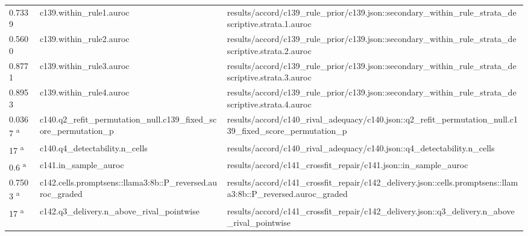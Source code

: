 \begin{longtable}{@{}p{0.7in}p{1.9in}p{2.6in}@{}}
0.7339 & c139.\allowbreak{}within\_rule1.\allowbreak{}auroc & results/\allowbreak{}accord/\allowbreak{}c139\_rule\_prior/\allowbreak{}c139.\allowbreak{}json::secondary\_within\_rule\_strata\_descriptive.\allowbreak{}strata.\allowbreak{}1.\allowbreak{}auroc\\
0.5600 & c139.\allowbreak{}within\_rule2.\allowbreak{}auroc & results/\allowbreak{}accord/\allowbreak{}c139\_rule\_prior/\allowbreak{}c139.\allowbreak{}json::secondary\_within\_rule\_strata\_descriptive.\allowbreak{}strata.\allowbreak{}2.\allowbreak{}auroc\\
0.8771 & c139.\allowbreak{}within\_rule3.\allowbreak{}auroc & results/\allowbreak{}accord/\allowbreak{}c139\_rule\_prior/\allowbreak{}c139.\allowbreak{}json::secondary\_within\_rule\_strata\_descriptive.\allowbreak{}strata.\allowbreak{}3.\allowbreak{}auroc\\
0.8953 & c139.\allowbreak{}within\_rule4.\allowbreak{}auroc & results/\allowbreak{}accord/\allowbreak{}c139\_rule\_prior/\allowbreak{}c139.\allowbreak{}json::secondary\_within\_rule\_strata\_descriptive.\allowbreak{}strata.\allowbreak{}4.\allowbreak{}auroc\\
0.0367 \textsuperscript{a} & c140.\allowbreak{}q2\_refit\_permutation\_null.\allowbreak{}c139\_fixed\_score\_permutation\_p & results/\allowbreak{}accord/\allowbreak{}c140\_rival\_adequacy/\allowbreak{}c140.\allowbreak{}json::q2\_refit\_permutation\_null.\allowbreak{}c139\_fixed\_score\_permutation\_p\\
17 \textsuperscript{a} & c140.\allowbreak{}q4\_detectability.\allowbreak{}n\_cells & results/\allowbreak{}accord/\allowbreak{}c140\_rival\_adequacy/\allowbreak{}c140.\allowbreak{}json::q4\_detectability.\allowbreak{}n\_cells\\
0.6 \textsuperscript{a} & c141.\allowbreak{}in\_sample\_auroc & results/\allowbreak{}accord/\allowbreak{}c141\_crossfit\_repair/\allowbreak{}c141.\allowbreak{}json::in\_sample\_auroc\\
0.7503 \textsuperscript{a} & c142.\allowbreak{}cells.\allowbreak{}promptsens::llama3:8b::P\_reversed.\allowbreak{}auroc\_graded & results/\allowbreak{}accord/\allowbreak{}c141\_crossfit\_repair/\allowbreak{}c142\_delivery.\allowbreak{}json::cells.\allowbreak{}promptsens::llama3:8b::P\_reversed.\allowbreak{}auroc\_graded\\
17 \textsuperscript{a} & c142.\allowbreak{}q3\_delivery.\allowbreak{}n\_above\_rival\_pointwise & results/\allowbreak{}accord/\allowbreak{}c141\_crossfit\_repair/\allowbreak{}c142\_delivery.\allowbreak{}json::q3\_delivery.\allowbreak{}n\_above\_rival\_pointwise\\

\end{longtable}
